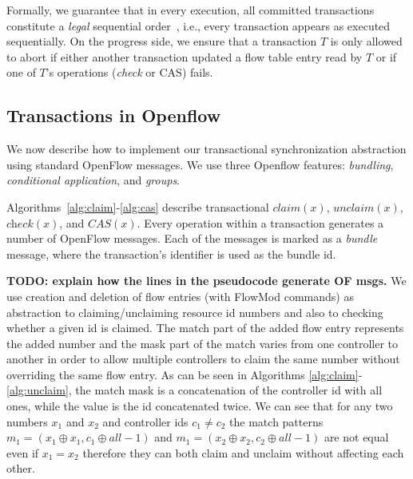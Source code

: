 \documentclass[conference]{sigcomm-alternate}
\newcommand{\concat}[0]{\oplus}
\begin{document}
Formally, we guarantee that in every execution, all committed
transactions constitute a \emph{legal} sequential
order~\cite{Pap79-serial}, i.e., every transaction appears as executed
sequentially. On the progress side, we ensure that a
transaction $T$ is only allowed to abort if either another 
transaction updated a flow table entry read by $T$  
or if one of $T$'s operations (\textit{check} or CAS) fails.




\subsection{Transactions in Openflow}\label{sec:t-impl}

We now describe how to implement our transactional synchronization
abstraction using standard OpenFlow messages.
We use three Openflow features: \emph{bundling},
\emph{conditional application}, and \emph{groups}.

Algorithms~\ref{alg:claim}-\ref{alg:cas} describe 
transactional  $\textit{claim}(x)$, $\textit{unclaim}(x)$,
$\textit{check}(x)$, and $\textit{CAS}(x)$. 
Every operation within a transaction generates a number of  OpenFlow
messages. Each of the messages is marked as a \emph{bundle} message,
where the transaction's identifier is used as the bundle id.
  
\textbf{TODO: explain how the lines in the pseudocode generate OF msgs.} 
We use creation and deletion of flow entries (with FlowMod commands) as abstraction to claiming/unclaiming  resource id numbers and also to checking whether a given id is claimed. The match part of the added flow entry represents the added
number and the mask part of the match varies from one controller to another in order to allow multiple controllers to claim the same number without overriding the same flow entry. 
As can be seen in Algorithms \ref{alg:claim}-\ref{alg:unclaim}, the match mask is a concatenation of the controller id with all ones, while the value is the id concatenated twice. We can see that for any two numbers $x_1$ and $x_2$ and controller ids $c_1\neq c_2$ the match patterns $m_1=(x_1\concat x_1, c_1\concat all-1)$ and $ m_1=(x_2\concat x_2, c_2\concat all-1)$ are not equal even if $x_1=x_2$ therefore they can both claim and unclaim without affecting each other.
\end{document}
